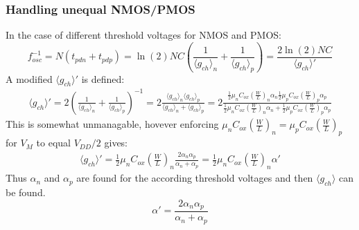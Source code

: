 		\subsubsection{Handling unequal NMOS/PMOS}
			In the case of different threshold voltages for NMOS and PMOS:
			\begin{equation}
				f_{osc}^{-1} = N(t_{pdn} + t_{pdp}) = \ln(2)NC\left(\frac{1}{\langle g_{ch}\rangle_n} + \frac{1}{\langle g_{ch}\rangle_p}\right) = \frac{2\ln(2)NC}{\langle g_{ch}\rangle'}
			\end{equation}	
			A modified $\langle g_{ch}\rangle'$ is defined:
			\begin{align}
				\langle g_{ch}\rangle' = 2\left(\frac{1}{\langle g_{ch}\rangle_n} + \frac{1}{\langle g_{ch}\rangle_p}\right)^{-1} = 2\frac{\langle g_{ch}\rangle_n \langle g_{ch}\rangle_p}{\langle g_{ch}\rangle_n + \langle g_{ch}\rangle_p}
				= 2\frac{\frac{1}{2}\mu_nC_{ox}\left(\frac{W}{L}\right)_n \alpha_n\frac{1}{2}\mu_pC_{ox}\left(\frac{W}{L}\right)_p \alpha_p}{\frac{1}{2}\mu_nC_{ox}\left(\frac{W}{L}\right)_n\alpha_n + \frac{1}{2}\mu_pC_{ox}\left(\frac{W}{L}\right)_p\alpha_p}
			\end{align}	
			This is somewhat unmanagable, hovever enforcing $\mu_nC_{ox}\left(\frac{W}{L}\right)_n = \mu_pC_{ox}\left(\frac{W}{L}\right)_p$ for $V_M$ to equal $V_{DD}/2$ gives:
			\begin{align}
				\langle g_{ch}\rangle' = \frac{1}{2}\mu_nC_{ox}\left(\frac{W}{L}\right)_n\frac{2 \alpha_n\alpha_p}{\alpha_n + \alpha_p} = \frac{1}{2}\mu_nC_{ox}\left(\frac{W}{L}\right)_n \alpha'
			\end{align}	
			Thus $\alpha_n$ and $\alpha_p$ are found for the according threshold voltages and then $\langle g_{ch}\rangle$ can be found.
			\begin{equation}
				\alpha' =  \frac{2 \alpha_n\alpha_p}{\alpha_n + \alpha_p}
			\end{equation}

